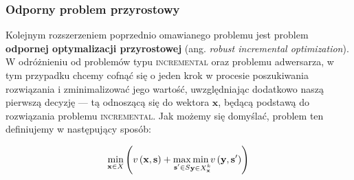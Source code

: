 \subsubsection{Odporny problem przyrostowy}

Kolejnym rozszerzeniem poprzednio omawianego problemu jest problem \textbf{odpornej optymalizacji przyrostowej} (ang. \textit{robust incremental optimization}). W odróżnieniu od problemów typu \textsc{incremental} oraz problemu adwersarza, w tym przypadku chcemy cofnąć się o jeden krok w procesie poszukiwania rozwiązania i zminimalizować jego wartość, uwzględniając dodatkowo naszą pierwszą decyzję --- tą odnoszącą się do wektora $\textbf{x}$, będącą podstawą do rozwiązania problemu \textsc{incremental}. Jak możemy się domyślać, problem ten definiujemy w następujący sposób:

\begin{equation}\label{eq:rimstdef}
	\min_{\mathclap{\textbf{x} \in X}} \left( v \left( \textbf{x}, \textbf{s} \right) + \max_{\mathclap{\textbf{s}^{\prime} \in S}} \min_{\mathclap{\textbf{y} \in X^{k}_{\textbf{x}}}} v \left( \textbf{y}, \textbf{s}^{\prime} \right) \right)
\end{equation}

